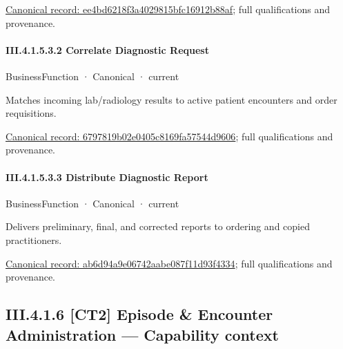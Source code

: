 {\footnotesize \href{../../../../../../../continuum/business/business-function/ee4bd6218f3a4029815bfc16912b88af.md}{Canonical record: ee4bd6218f3a4029815bfc16912b88af}; full qualifications and provenance.}\par
\paragraph*{III.4.1.5.3.2 Correlate Diagnostic Request}
\label{navigation:III.4.1.5.3.2}

\label{element:6797819b02e0405c8169fa57544d9606}
{\small BusinessFunction · Canonical · current}\par

Matches incoming lab/radiology results to active patient encounters and order requisitions.


{\footnotesize \href{../../../../../../../continuum/business/business-function/6797819b02e0405c8169fa57544d9606.md}{Canonical record: 6797819b02e0405c8169fa57544d9606}; full qualifications and provenance.}\par
\paragraph*{III.4.1.5.3.3 Distribute Diagnostic Report}
\label{navigation:III.4.1.5.3.3}

\label{element:ab6d94a9e06742aabe087f11d93f4334}
{\small BusinessFunction · Canonical · current}\par

Delivers preliminary, final, and corrected reports to ordering and copied practitioners.


{\footnotesize \href{../../../../../../../continuum/business/business-function/ab6d94a9e06742aabe087f11d93f4334.md}{Canonical record: ab6d94a9e06742aabe087f11d93f4334}; full qualifications and provenance.}\par
\subsection*{III.4.1.6 [CT2] Episode \& Encounter Administration — Capability context}
\label{navigation:III.4.1.6}


